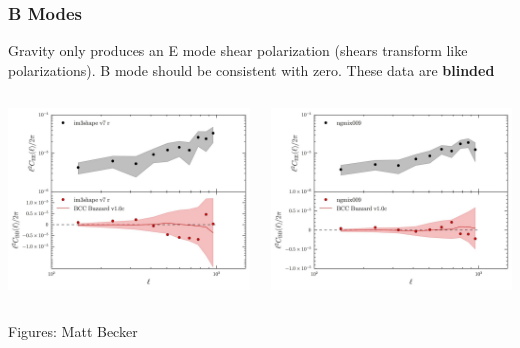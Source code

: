 \documentclass{beamer}
\begin{document}
\frame
{
    \frametitle{B Modes}

    Gravity only produces an E mode shear polarization (shears transform like
    polarizations).  B mode should be consistent with zero.  These data are
    {\bf blinded}

    \begin{columns}
        \begin{column}{0.5\textwidth}
            \begin{center}
                \includegraphics[width=\textwidth]{bmode-im3shape.png}
            \end{center}
        \end{column}
        \begin{column}{0.5\textwidth}
            \begin{center}
                \includegraphics[width=\textwidth]{bmode-ngmix.png}
            \end{center}
        \end{column}
    \end{columns}
    {\tiny Figures: Matt Becker}
}
\end{document}
